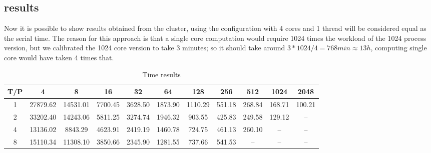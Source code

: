 \documentclass[10pt]{article}
\begin{document}
\begin{multicols}{2}
\subsection*{results}
\label{results}
Now it is possible to show results obtained from the cluster,
using the configuration with 4 cores and 1 thread will be considered
equal as the serial time. The reason for this approach is that a single core computation would require 1024 times the workload of the 1024 process version, but we calibrated the 1024 core version to take 3 minutes;
so it should take around $3*1024/4=768min \approx 13h $, computing single core would have taken 4 times that.
\begin{table}[H]
\centering
\tiny  
\setlength{\tabcolsep}{3pt}
\begin{tabular}{|c|*{10}{c}|}
  \hline
  T/P & 4 & 8 & 16 & 32 & 64 & 128 & 256 & 512 & 1024 & 2048 \\
  \hline
  1 & 27879.62 & 14531.01 & 7700.45 & 3628.50 & 1873.90 & 1110.29 & 551.18 & 268.84 & 168.71 & 100.21 \\
  2 & 33202.40 & 14243.06 & 5811.25 & 3274.74 & 1946.32 & 903.55 & 425.83 & 249.58 & 129.12 & -- \\
  4 & 13136.02 & 8843.29 & 4623.91 & 2419.19 & 1460.78 & 724.75 & 461.13 & 260.10 & -- & -- \\
  8 & 15110.34 & 11308.10 & 3850.66 & 2345.90 & 1281.55 & 737.66 & 541.53 & -- & -- & -- \\
  \hline
\end{tabular}
\caption{Time results}
\label{time_results}
\end{table}


\end{multicols}
\end{document}
